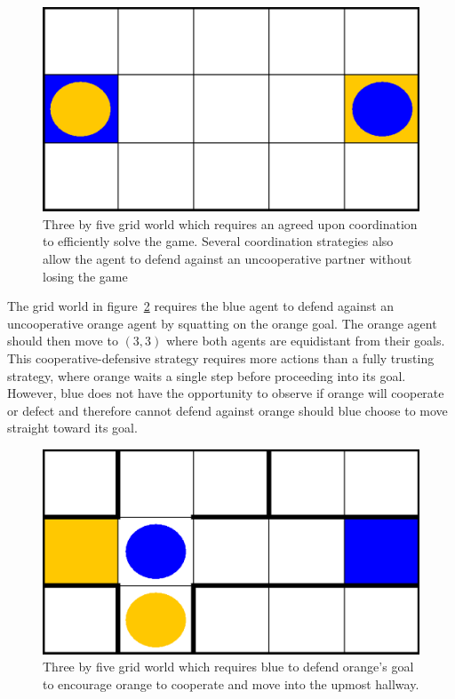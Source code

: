 \documentclass[letterpaper]{article}
\begin{document}
\begin{figure}
\centering
\includegraphics[width=0.8\columnwidth]{figures/threebyfive.png}
\caption{Three by five grid world which requires an agreed upon coordination to efficiently solve the game. Several coordination strategies also allow the agent to defend against an uncooperative partner without losing the game}
\label{fig:threebyfive}
\end{figure}

The grid world in figure~\ref{fig:threebyfivehallways} requires the blue agent to defend against an uncooperative orange agent by squatting on the orange goal. The orange agent should then move to $(3,3)$ where both agents are equidistant from their goals. This cooperative-defensive strategy requires more actions than a fully trusting strategy, where orange waits a single step before proceeding into its goal. However, blue does not have the opportunity to observe if orange will cooperate or defect and therefore cannot defend against orange should blue choose to move straight toward its goal.


\begin{figure}
\centering
\includegraphics[width=0.8\columnwidth]{figures/threebyfivehallways.png}
\caption{Three by five grid world which requires blue to defend orange's goal to encourage orange to cooperate and move into the upmost hallway.}
\label{fig:threebyfivehallways}
\end{figure}
\end{document}
